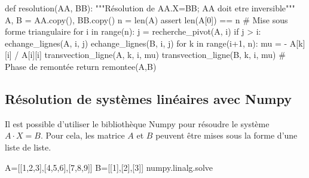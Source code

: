 \documentclass[10pt]{article}
\begin{document}
\begin{py}
\begin{python}
def resolution(AA, BB):
    """Résolution de AA.X=BB; AA doit etre inversible"""
    A, B = AA.copy(), BB.copy()
    n = len(A)
    assert len(A[0]) == n
    # Mise sous forme triangulaire
    for i in range(n):
        j = recherche_pivot(A, i)
        if j > i:
            echange_lignes(A, i, j)
            echange_lignes(B, i, j)
        for k in range(i+1, n):
            mu = - A[k][i] / A[i][i]
            transvection_ligne(A, k, i, mu)
            transvection_ligne(B, k, i, mu)
    # Phase de remontée
    return remontee(A,B)
\end{python}


\end{py}
%
%


\subsection{Résolution de systèmes linéaires avec Numpy}
Il est possible d'utiliser le bibliothèque Numpy pour résoudre le système $A\cdot X = B$. 
Pour cela, les matrice $A$ et $B$ peuvent être mises sous la forme d'une liste de liste. 

\begin{py}
\begin{python}
A=[[1,2,3],[4,5,6],[7,8,9]]
B=[[1],[2],[3]]
numpy.linalg.solve
\end{python}
\end{py}

\begin{thebibliography}{2}
\end{thebibliography}
\end{document}
